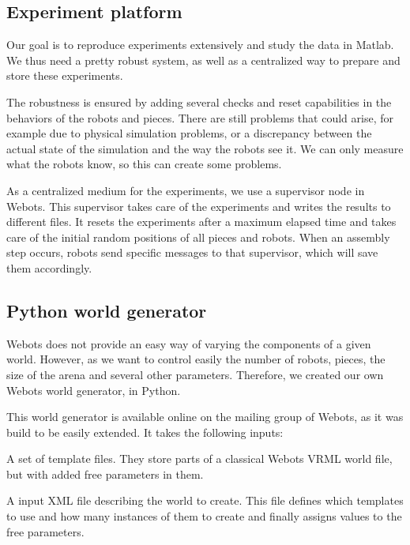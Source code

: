 	\subsection{Experiment platform} %
	\label{sub:experiment_platform}
	
		Our goal is to reproduce experiments extensively and study the data in Matlab. We thus need a pretty robust system, as well as a centralized way to prepare and store these experiments.
		
		The robustness is ensured by adding several checks and reset capabilities in the behaviors of the robots and pieces. There are still problems that could arise, for example due to physical simulation problems, or a discrepancy between the actual state of the simulation and the way the robots see it. We can only measure what the robots know, so this can create some problems.
		
		As a centralized medium for the experiments, we use a supervisor node in Webots. This supervisor takes care of the experiments and writes the results to different files. It resets the experiments after a maximum elapsed time and takes care of the initial random positions of all pieces and robots. When an assembly step occurs, robots send specific messages to that supervisor, which will save them accordingly.
		
	
	\subsection{Python world generator} %
	\label{sub:python_world_generator}
		
		Webots does not provide an easy way of varying the components of a given world. However, as we want to control easily the number of robots, pieces, the size of the arena and several other parameters. Therefore, we created our own Webots world generator, in Python.
		
		This world generator is available online on the mailing group of Webots, as it was build to be easily extended. It takes the following inputs:
		
		\begin{my_itemize}
			\item A set of template files. They store parts of a classical Webots VRML world file, but with added free parameters in them.
			\item A input XML file describing the world to create. This file defines which templates to use and how many instances of them to create and finally assigns values to the free parameters.
		\end{my_itemize}
		
